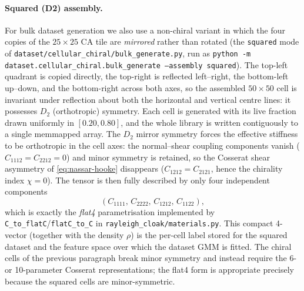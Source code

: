 \documentclass{article}
\begin{document}
\paragraph{Squared (D2) assembly.}
For bulk dataset generation we also use a non-chiral variant in which the four
copies of the $25\times25$ CA tile are \emph{mirrored} rather than rotated (the
\texttt{squared} mode of \texttt{dataset/cellular\_chiral/bulk\_generate.py}, run
as \texttt{python -m dataset.cellular\_chiral.bulk\_generate --assembly squared}).
The top-left quadrant is copied directly, the top-right is reflected left--right,
the bottom-left up--down, and the bottom-right across both axes, so the assembled
$50\times50$ cell is invariant under reflection about both the horizontal and
vertical centre lines: it possesses $D_2$ (orthotropic) symmetry. Each cell is
generated with its live fraction drawn uniformly in $[0.20, 0.80]$, and the whole
library is written contiguously to a single memmapped array. The $D_2$ mirror
symmetry forces the effective stiffness to be orthotropic in the cell axes: the
normal--shear coupling components vanish ($C_{1112}=C_{2212}=0$) and minor
symmetry is retained, so the Cosserat shear asymmetry of
\eqref{eq:nassar-hooke} disappears ($C_{1212}=C_{2121}$, hence the chirality
index $\chi=0$). The tensor is then fully described by only four independent
components
\begin{equation}
  (C_{1111},\,C_{2222},\,C_{1212},\,C_{1122}),
  \label{eq:flat4}
\end{equation}
which is exactly the \emph{flat4} parametrisation implemented by
\texttt{C\_to\_flatC}/\texttt{flatC\_to\_C} in
\texttt{rayleigh\_cloak/materials.py}. This compact 4-vector (together with the
density $\rho$) is the per-cell label stored for the squared dataset and the
feature space over which the dataset GMM is fitted. The chiral cells of the
previous paragraph break minor symmetry and instead require the 6- or
10-parameter Cosserat representations; the flat4 form is appropriate precisely
because the squared cells are minor-symmetric.



\end{document}
